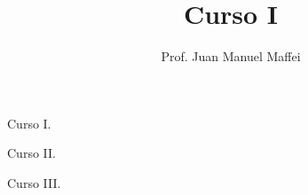 \documentclass{article}
\title{Curso I}
\author{Prof. Juan Manuel Maffei}
\begin{document}
    \maketitle

    Curso I.
    
    Curso II.

    Curso III.
    
\end{document}
